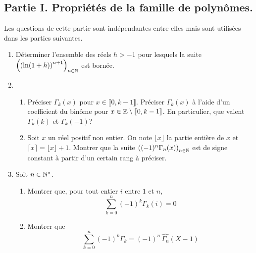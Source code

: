 \subsection*{Partie I. Propriétés de la famille de polynômes.}
Les questions de cette partie sont indépendantes entre elles mais sont utilisées dans les parties suivantes.
\begin{enumerate}
 \item Déterminer l'ensemble des réels $h>-1$ pour lesquels la suite $\left(\left(\ln(1+h)\right) ^{n+1}\right) _{n\in \mathbb{N}}$ est bornée.
 \item
\begin{enumerate}
 \item Préciser $\Gamma_k(x)$ pour $x\in \llbracket 0, k-1\rrbracket$. Préciser $\Gamma_k(x)$ à l'aide d'un coefficient du binôme pour $x\in \mathbb{Z} \setminus \llbracket 0, k-1\rrbracket$. En particulier, que valent $\Gamma_k(k)$ et $\Gamma_k(-1)$?
 \item Soit $x$ un réel positif non entier. On note $\lfloor x \rfloor$ la partie entière de $x$ et $\lceil x \rceil = \lfloor x \rfloor +1$. Montrer que la suite $\left( (-1)^n\Gamma_n(x)\right) _{n\in \mathbb{N}}$ est de signe constant à partir d'un certain rang à préciser.
\end{enumerate}


\item Soit $n\in \mathbb{N}^*$.
\begin{enumerate} 
 \item Montrer que, pour tout entier $i$ entre $1$ et $n$,
\begin{displaymath}
 \sum_{k=0}^n(-1)^k\Gamma_k(i) = 0
\end{displaymath}
\item Montrer que
\begin{displaymath}
 \sum_{k=0}^n(-1)^k\Gamma_k = (-1)^n \,\widehat{\Gamma_n}(X-1)
\end{displaymath}
\end{enumerate}


\end{enumerate}
